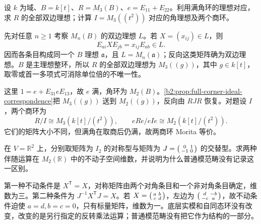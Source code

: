 \begin{exercise}\label{b2:ex:16-full-corner-ideals}
	设 \(k\) 为域、\(B=k[t]\)、\(R=M_3(B)\)、\(e=E_{11}+E_{22}\)。利用满角环的理想对应，求 \(R\) 的全部双边理想；计算 \(I=M_3((t^2))\) 对应的角理想及两个商环。
\end{exercise}
\begin{solution}
	先对任意 \(n\ge1\) 考察 \(M_n(B)\) 的双边理想 \(L\)。若 \(X=(x_{ij})\in L\)，则
	\[
		E_{ai}XE_{jb}=x_{ij}E_{ab}\in L.
	\]
	因而各条目构成同一个 \(B\) 理想 \(\mathfrak a\)，且 \(L=M_n(\mathfrak a)\)；反向这类矩阵确为双边理想。\(B\) 是主理想整环，所以 \(R\) 的全部双边理想为 \(M_3((g))\)，其中 \(g\in k[t]\)，取零或首一多项式可消除单位倍的不唯一性。

	这里 \(1=e+E_{31}eE_{13}\)，故 \(e\) 满，角环为 \(M_2(B)\)。\cref{b2:prop:full-corner-ideal-correspondence}把 \(M_3((g))\) 送到 \(M_2((g))\)，反向由 \(RJR\) 恢复。对题设 \(I\)，两个商环为
	\[
		R/I\cong M_3(k[t]/(t^2)),\qquad eRe/eIe\cong M_2(k[t]/(t^2)).
	\]
	它们的矩阵大小不同，但满角在取商后仍满，故两商环 Morita 等价。
\end{solution}

\begin{exercise}\label{b2:ex:16-symmetric-alternating-forgotten}
	在 \(V=\mathbb R^2\) 上，分别取矩阵为 \(I_2\) 的对称型与矩阵为 \(J=\begin{psmallmatrix}0&1\\-1&0\end{psmallmatrix}\) 的交替型。求两种伴随运算在 \(M_2(\mathbb R)\) 中的不动子空间维数，并说明为什么普通模范畴没有记录这一区别。
\end{exercise}
\begin{solution}
	第一种不动条件是 \(X^{\mathsf T}=X\)，对称矩阵由两个对角条目和一个非对角条目确定，维数为三。第二种条件为 \(J^{-1}X^{\mathsf T}J=X\)。若 \(X=\begin{psmallmatrix}a&b\\c&d\end{psmallmatrix}\)，左边为 \(\begin{psmallmatrix}d&-b\\-c&a\end{psmallmatrix}\)，故不动条件迫使 \(a=d,b=c=0\)，只有标量矩阵，维数为一。底层实模和自同态环没有改变，改变的是另行指定的反转乘法运算；普通模范畴没有把它作为结构的一部分。
\end{solution}

